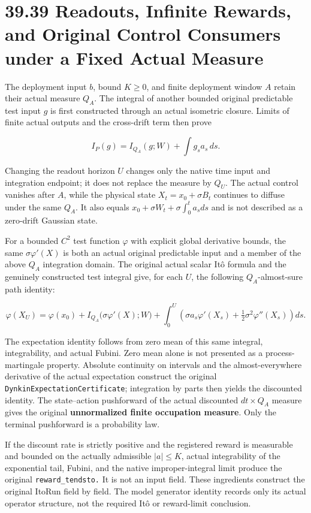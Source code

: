 \documentclass[
  english,
  11pt,
  oneside]{book}
\begin{document}
\section{39.39 Readouts, Infinite Rewards, and Original Control Consumers under a Fixed Actual Measure}\label{readouts-infinite-rewards-and-original-control-consumers-under-a-fixed-actual-measure}

The deployment input \(b\), bound \(K\ge0\), and finite deployment window \(A\) retain their actual measure \(Q_A\). The integral of another bounded original predictable test input \(g\) is first constructed through an actual isometric closure. Limits of finite actual outputs and the cross-drift term then prove

\[I_P(g)=I_{Q_A}(g;W)+\int g_s a_s\,ds.\]

Changing the readout horizon \(U\) changes only the native time input and integration endpoint; it does not replace the measure by \(Q_U\). The actual control vanishes after \(A\), while the physical state \(X_t=x_0+\sigma B_t\) continues to diffuse under the same \(Q_A\). It also equals \(x_0+\sigma W_t+\sigma\int_0^t a_sds\) and is not described as a zero-drift Gaussian state.

For a bounded \(C^2\) test function \(\varphi\) with explicit global derivative bounds, the same \(\sigma\varphi'(X)\) is both an actual original predictable input and a member of the above \(Q_A\) integration domain. The original actual scalar Itô formula and the genuinely constructed test integral give, for each \(U\), the following \(Q_A\)-almost-sure path identity:

\[\varphi(X_U)=\varphi(x_0)+I_{Q_A}\bigl(\sigma\varphi'(X);W\bigr)
+\int_0^U\left(\sigma a_s\varphi'(X_s)+\tfrac12\sigma^2\varphi''(X_s)\right)ds.\]

The expectation identity follows from zero mean of this same integral, integrability, and actual Fubini. Zero mean alone is not presented as a process-martingale property. Absolute continuity on intervals and the almost-everywhere derivative of the actual expectation construct the original \nolinkurl{DynkinExpectationCertificate}; integration by parts then yields the discounted identity. The state--action pushforward of the actual discounted \(dt\times Q_A\) measure gives the original \textbf{unnormalized finite occupation measure}. Only the terminal pushforward is a probability law.

If the discount rate is strictly positive and the registered reward is measurable and bounded on the actually admissible \(|a|\le K\), actual integrability of the exponential tail, Fubini, and the native improper-integral limit produce the original \nolinkurl{reward_tendsto.} It is not an input field. These ingredients construct the original ItoRun field by field. The model generator identity records only its actual operator structure, not the required Itô or reward-limit conclusion.
\end{document}

